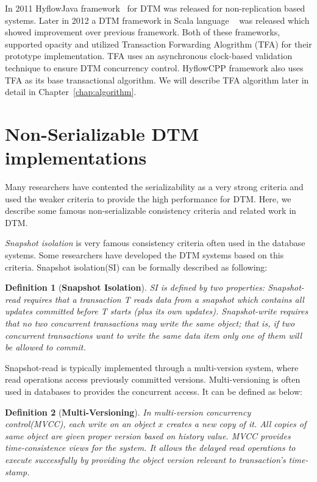 \documentclass[12pt,english]{report}
\newtheorem{definition}{Definition}[section]
\begin{document}
In 2011 HyflowJava framework~\cite{Saad:2011:HHP:1996130.1996167} for DTM was released for non-replication based systems. Later in 2012 a DTM framework in Scala language ~\cite{turcuhyflow2}  was released which showed improvement over previous framework. Both of these frameworks, supported opacity and utilized Transaction Forwarding Alogrithm (TFA) for their prototype implementation. TFA uses an asynchronous clock-based validation technique to ensure DTM concurrency control. HyflowCPP framework also uses TFA as its base transactional algorithm. We will describe TFA algorithm later in detail in Chapter~\ref{chap:algorithm}.   

\section{Non-Serializable DTM implementations}

Many researchers have contented the serializability as a very strong criteria and used the weaker criteria to provide the high performance for DTM. Here, we describe some famous non-serializable consistency criteria and  related work in DTM. 

\textit{Snapshot isolation} is very famous consistency criteria often used in the database systems. Some researchers have developed the DTM systems based on this criteria. Snapshot isolation(SI) can be formally described as following:

\begin{definition}[\textbf{Snapshot Isolation}]
SI is defined by two properties: \textit{Snapshot-read} requires that a transaction T reads data from a snapshot which contains all updates committed before T starts (plus its own updates). \textit{Snapshot-write} requires that no two concurrent transactions may write the same object; that is, if two concurrent transactions want to write the same data item only one of them will be allowed to commit.~\cite{SnapShot:Berenson:1995:CAS:223784.223785, SnapShot2:Lin:2009:SII:1538909.1538913}
\end{definition}

Snapshot-read is typically implemented through a multi-version system, where read operations access previously committed versions. Multi-versioning is often used in databases to provides the concurrent access. It can be defined as below:
\begin{definition}[\textbf{Multi-Versioning}]
In multi-version concurrency control(MVCC), each write on an object $x$ creates a new copy of it. All copies of same object are given proper version based on history value. MVCC provides time-consistence views for the system. It allows the delayed read operations to execute successfully by providing the object version relevant to transaction's time-stamp. 
\end{definition}
\end{document}
